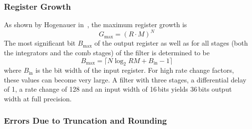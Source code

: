 \subsubsection{Register Growth}
\label{subsubsec:cic:register_growth}

As shown by Hogenauer in~\cite{1163535}, the maximum register growth is
\begin{equation}
    \label{eq:cic:maximum_register_growth}
    G_\mathrm{max} = (R \cdot M)^N
\end{equation}
The most  significant bit $B_\mathrm{max}$ of  the output register as  well as
for all  stages (both the  integrators and the comb  stages) of the  filter is
determined to be
\begin{equation}
    \label{eq:cic:maximum_register_growth:bit_width}
    B_\mathrm{max} = \lceil N \log_2 RM + B_\mathrm{in} - 1 \rceil
\end{equation}
where $B_\mathrm{in}$ is  the bit width of the input  register.  For high rate
change  factors, these  values can  become very  large.  A  filter with  three
stages, a  differential delay of  \num{1}, a rate  change of \num{128}  and an
input  width of  \num{16}\,bits  yields  \num{36}\,bits output  width at  full
precision.
%
%
\subsubsection{Errors Due to Truncation and Rounding}
\label{subsubsec:cic:truncation_and_rounding}

